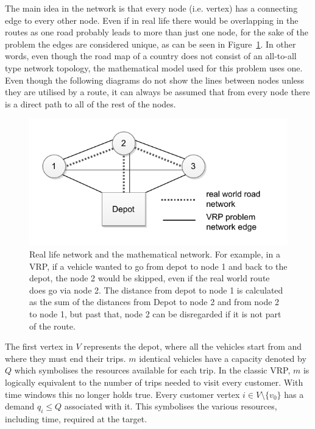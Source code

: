 The main idea in the network is that every node (i.e. vertex) has a connecting edge to every other node. Even if in real life there would be overlapping in the routes as one road probably leads to more than just one node, for the sake of the problem the edges are considered unique, as can be seen in Figure~\ref{fig:reallifenetwork}. In other words, even though the road map of a country does not consist of an all-to-all type network topology, the mathematical model used for this problem uses one. Even though the following diagrams do not show the lines between nodes unless they are utilised by a route, it can always be assumed that from every node there is a direct path to all of the rest of the nodes. 

\begin{figure}[h]
  \begin{center}
    \includegraphics{images/simplenetwork.pdf}
    \caption{Real life network and the mathematical network. For example, in a VRP, if a vehicle wanted to go from depot to node 1 and back to the depot, the node 2 would be skipped, even if the real world route does go via node 2. The distance from depot to node 1 is calculated as the sum of the distances from Depot to node 2 and from node 2 to node 1, but past that, node 2 can be disregarded if it is not part of the route. }
    \label{fig:reallifenetwork}
  \end{center}
\end{figure}

The first vertex in $V$ represents the depot, where all the vehicles start from and where they must end their trips. $m$ identical vehicles have a capacity denoted by $Q$ which symbolises the resources available for each trip. In the classic VRP, $m$ is logically equivalent to the number of trips needed to visit every customer. With time windows this no longer holds true. Every customer vertex $i \in V\setminus\{v_0\}$ has a demand $q_i \leq Q$ associated with it. This symbolises the various resources, including time, required at the target. \cite{laporte2007you}

